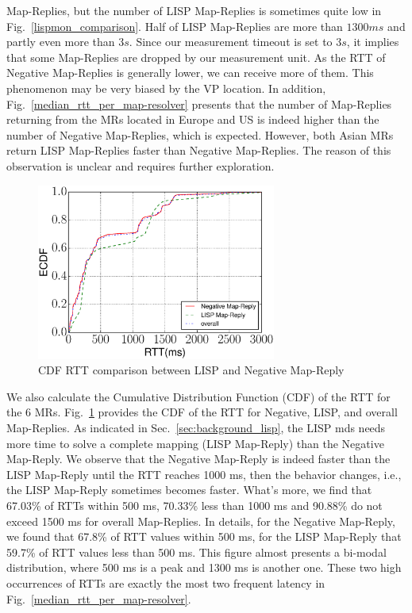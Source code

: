 Map-Replies, but the number of LISP Map-Replies is sometimes quite low in
Fig.~\ref{lispmon_comparison}. Half of LISP Map-Replies are more than $1300 ms$
and partly even more than $3 s$. Since our measurement timeout is set to $3 s$,
it implies that some Map-Replies are dropped by our measurement unit.  As the
RTT of Negative Map-Replies is generally lower, we can receive more of them. This
phenomenon may be very biased by the VP location. %
In addition, Fig.~\ref{median_rtt_per_map-resolver} presents that the number of
Map-Replies returning from the MRs  located in Europe and US is indeed higher
than the number of Negative Map-Replies, which is expected. However, both Asian MRs
return LISP Map-Replies faster than Negative Map-Replies. The reason of this 
observation is unclear and requires further exploration.

\begin{figure}[!t]
        \centering
        \includegraphics[width=0.7\textwidth]{Pics/ecdf_of_RTT.eps}
        \caption{CDF RTT comparison between LISP and Negative Map-Reply}
        \label{ecdf_rtt_lisp_negative}
\end{figure}
We also calculate the Cumulative Distribution Function (CDF) of the
RTT for the 6 MRs. Fig.~\ref{ecdf_rtt_lisp_negative} provides the CDF of the
RTT for Negative, LISP, and overall Map-Replies. As indicated in
Sec.~\ref{sec:background_lisp}, the LISP \acrshort{mds} needs more time to solve a
complete mapping (LISP Map-Reply) than the Negative Map-Reply.  We observe that
the Negative Map-Reply is indeed faster than the LISP Map-Reply until the RTT
reaches 1000 ms, then the behavior changes, i.e., the LISP Map-Reply
sometimes becomes faster. What's more, we find that 67.03\% of RTTs within
500 ms, 70.33\% less than 1000 ms and 90.88\% do not exceed 1500 ms
for overall Map-Replies. In details, for the Negative Map-Reply, we found that
67.8\% of RTT values within 500 ms, for the LISP Map-Reply that 59.7\% of
RTT values less than 500 ms. This figure almost presents a bi-modal
distribution, where 500 ms is a peak and 1300 ms is another one. These two
high occurrences of RTTs are exactly the most two frequent latency in
Fig.~\ref{median_rtt_per_map-resolver}.


